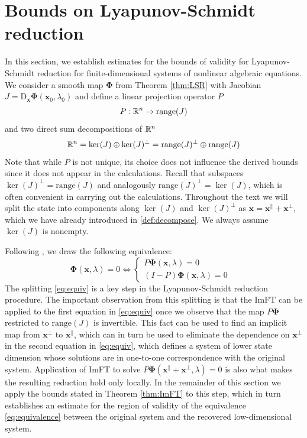 \documentclass[letterpaper, 10 pt, conference, dvipsnames]{ieeeconf}
\begin{document}
\section{Bounds on Lyapunov-Schmidt reduction \label{sec:bounds}}
In this section, we  establish estimates for the bounds of validity for Lyapunov-Schmidt reduction for finite-dimensional systems of nonlinear algebraic equations.
We consider a smooth map \(\boldsymbol{\Phi}\) from Theorem \ref{thm:LSR} with Jacobian \(J = \mathrm{D}_\mathbf{x}\boldsymbol{\Phi}(\mathbf{x}_0,\lambda_0)\) and define a linear projection operator \(P\)
\begin{equation}
    P:\R[n]\to\mathrm{range}(J)\label{def:project}
\end{equation}
and two direct sum decompositions of \(\R[n]\)
\begin{equation}
    \R[n] = \ker(J)\oplus\ker(J)^{\perp} = \mathrm{range}(J)^\perp\oplus\mathrm{range}(J) \label{eq:orth_split}
\end{equation}
{Note that while \(P\) is not unique, its choice does not influence the derived bounds since it does not appear in the calculations.} Recall that subspaces \(\ker(J)^{\perp} = \mathrm{range}(J)\) and analogously \(\mathrm{range}(J)^{\perp} = \ker(J)\), which is often convenient in carrying out the calculations. Throughout the text we will split the state into components along \(\ker(J)\) and \(\ker(J)^{\perp}\) as \(\mathbf{x} = \mathbf{x}^{\parallel} + \mathbf{x}^{\perp}\), which we have already introduced in \eqref{def:decompose}.  We always assume \(\ker(J)\) is nonempty.

Following \cite[Chapter VII]{Golubitsky1985}, we draw the following equivalence:
\begin{equation}
    \boldsymbol{\Phi}(\mathbf{x},\lambda) = 0\iff
    \begin{cases}
        P\boldsymbol{\Phi}(\mathbf{x},\lambda)      = 0 & \\
        (I-P)\boldsymbol{\Phi}(\mathbf{x},\lambda)  = 0 &
    \end{cases}\label{eq:equiv}
\end{equation}
The splitting \eqref{eq:equiv} is a key step in the Lyapunov-Schmidt reduction procedure. The important observation from this splitting is that the ImFT can be applied to the first equation in \eqref{eq:equiv} once we observe that the map \(P\boldsymbol{\Phi}\) restricted to \(\mathrm{range}(J)\) is invertible. This fact can be used to find an implicit map from \(\mathbf{x}^{\perp}\) to \(\mathbf{x}^{\parallel}\), which can in turn be used to eliminate the dependence on \(\mathbf{x}^{\perp}\) in the second equation in \eqref{eq:equiv}, which defines a system of lower state dimension whose solutions are in one-to-one correspondence with the original system. Application of ImFT to solve \(P\boldsymbol{\Phi}(\mathbf{x}^{\parallel}+\mathbf{x}^{\perp},\lambda) = 0\) is also what makes the resulting reduction hold only locally. In the remainder of this section we apply the bounds stated in Theorem \ref{thm:ImFT} to this step, which in turn establishes an estimate for the region of validity of the equivalence \eqref{eq:equivalence} between the original system and the recovered low-dimensional system.
\end{document}
